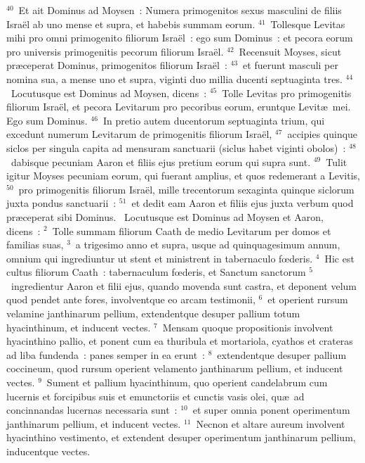 ${}^{40}$~Et ait Dominus ad Moysen~: Numera primogenitos sexus masculini de filiis Isra\"el ab uno mense et supra, et habebis summam eorum.
${}^{41}$~Tollesque Levitas mihi pro omni primogenito filiorum Isra\"el~: ego sum Dominus~: et pecora eorum pro universis primogenitis pecorum filiorum Isra\"el.
${}^{42}$~Recensuit Moyses, sicut pr\ae ceperat Dominus, primogenitos filiorum Isra\"el~:
${}^{43}$~et fuerunt masculi per nomina sua, a mense uno et supra, viginti duo millia ducenti septuaginta tres.
${}^{44}$~Locutusque est Dominus ad Moysen, dicens~:
${}^{45}$~Tolle Levitas pro primogenitis filiorum Isra\"el, et pecora Levitarum pro pecoribus eorum, eruntque Levit\ae\ mei. Ego sum Dominus.
${}^{46}$~In pretio autem ducentorum septuaginta trium, qui excedunt numerum Levitarum de primogenitis filiorum Isra\"el,
${}^{47}$~accipies quinque siclos per singula capita ad mensuram sanctuarii (siclus habet viginti obolos)~:
${}^{48}$~dabisque pecuniam Aaron et filiis ejus pretium eorum qui supra sunt.
${}^{49}$~Tulit igitur Moyses pecuniam eorum, qui fuerant amplius, et quos redemerant a Levitis,
${}^{50}$~pro primogenitis filiorum Isra\"el, mille trecentorum sexaginta quinque siclorum juxta pondus sanctuarii~:
${}^{51}$~et dedit eam Aaron et filiis ejus juxta verbum quod pr\ae ceperat sibi Dominus.
~Locutusque est Dominus ad Moysen et Aaron, dicens~:
${}^{2}$~Tolle summam filiorum Caath de medio Levitarum per domos et familias suas,
${}^{3}$~a trigesimo anno et supra, usque ad quinquagesimum annum, omnium qui ingrediuntur ut stent et ministrent in tabernaculo fœderis.
${}^{4}$~Hic est cultus filiorum Caath~: tabernaculum fœderis, et Sanctum sanctorum
${}^{5}$~ingredientur Aaron et filii ejus, quando movenda sunt castra, et deponent velum quod pendet ante fores, involventque eo arcam testimonii,
${}^{6}$~et operient rursum velamine janthinarum pellium, extendentque desuper pallium totum hyacinthinum, et inducent vectes.
${}^{7}$~Mensam quoque propositionis involvent hyacinthino pallio, et ponent cum ea thuribula et mortariola, cyathos et crateras ad liba fundenda~: panes semper in ea erunt~:
${}^{8}$~extendentque desuper pallium coccineum, quod rursum operient velamento janthinarum pellium, et inducent vectes.
${}^{9}$~Sument et pallium hyacinthinum, quo operient candelabrum cum lucernis et forcipibus suis et emunctoriis et cunctis vasis olei, qu\ae\ ad concinnandas lucernas necessaria sunt~:
${}^{10}$~et super omnia ponent operimentum janthinarum pellium, et inducent vectes.
${}^{11}$~Necnon et altare aureum involvent hyacinthino vestimento, et extendent desuper operimentum janthinarum pellium, inducentque vectes.
